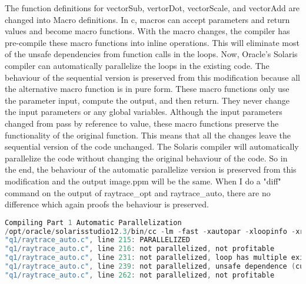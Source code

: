 \documentclass[12pt]{article}
\begin{document}
\indent
The function definitions for vectorSub, vertorDot, vectorScale, and vectorAdd are changed into Macro definitions. In c, macros can accept parameters and return values and become macro functions. With the macro changes, the compiler has pre-compile these macro functions into inline operations. This will eliminate most of the unsafe dependencies from function calls in the loops. Now, Oracle’s Solaris compiler can automatically parallelize the loops in the existing code. The behaviour of the sequential version is preserved from this modification because all the alternative macro function is in pure form. These macro functions only use the parameter input, compute the output, and then return. They never change the input parameters or any global variables. Although the input parameters changed from pass by reference to value, these macro functions preserve the functionality of the original function. This means that all the changes leave the sequential version of the code unchanged. The Solaris compiler will automatically parallelize the code without changing the original behaviour of the code. So in the end, the behaviour of the automatic parallelize version is preserved from this modification and the output image.ppm will be the same. When I do a "diff" command on the output of raytrace\_opt and raytrace\_auto, there are no difference which again proofs the behaviour is preserved. \\
\begin{lstlisting}[language=c, caption=Compiler Output]
Compiling Part 1 Automatic Parallelization
/opt/oracle/solarisstudio12.3/bin/cc -lm -fast -xautopar -xloopinfo -xreduction -xbuiltin q1/raytrace_auto.c -o bin/raytrace_auto
"q1/raytrace_auto.c", line 215: PARALLELIZED
"q1/raytrace_auto.c", line 216: not parallelized, not profitable
"q1/raytrace_auto.c", line 231: not parallelized, loop has multiple exits
"q1/raytrace_auto.c", line 239: not parallelized, unsafe dependence (currentSphere t)
"q1/raytrace_auto.c", line 262: not parallelized, not profitable
\end{lstlisting}
\end{document}
